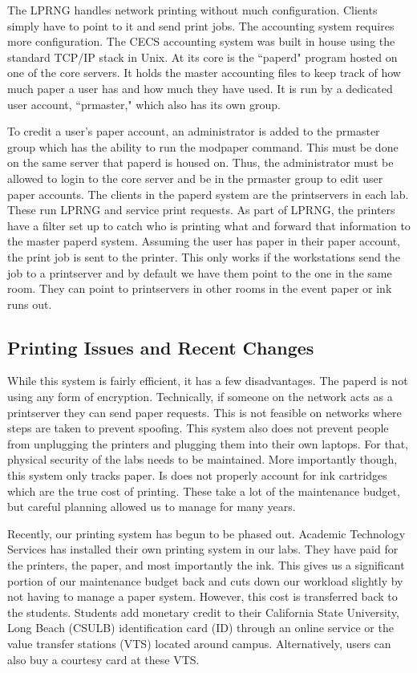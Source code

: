 The LPRNG handles network printing without much configuration.  Clients simply have to point to it and send print jobs.  The accounting system requires more configuration.  The CECS accounting system was built in house using the standard TCP/IP stack in Unix.  At its core is the ``paperd" program hosted on one of the core servers.  It holds the master accounting files to keep track of how much paper a user has and how much they have used.  It is run by a dedicated user account, ``prmaster," which also has its own group.  

To credit a user's paper account, an administrator is added to the prmaster group which has the ability to run the modpaper command.  This must be done on the same server that paperd is housed on.  Thus, the administrator must be allowed to login to the core server and be in the prmaster group to edit user paper accounts.  
\vfill\eject
The clients in the paperd system are the printservers in each lab.  These run LPRNG and service print requests.  As part of LPRNG, the printers have a filter set up to catch who is printing what and forward that information to the master paperd system.  Assuming the user has paper in their paper account, the print job is sent to the printer. This only works if the workstations send the job to a printserver and by default we have them point to the one in the same room. They can point to printservers in other rooms in the event paper or ink runs out. 

\subsection{Printing Issues and Recent Changes}
While this system is fairly efficient, it has a few disadvantages.  The paperd is not using any form of encryption.  Technically, if someone on the network acts as a printserver they can send paper requests.  This is not feasible on networks where steps are taken to prevent spoofing.  This system also does not prevent people from unplugging the printers and plugging them into their own laptops.  For that, physical security of the labs needs to be maintained.  More importantly though, this system only tracks paper.  Is does not properly account for ink cartridges which are the true cost of printing.  These take a lot of the maintenance budget, but careful planning allowed us to manage for many years.  

Recently, our printing system has begun to be phased out.  Academic Technology Services has installed their own printing system in our labs.  They have paid for the printers, the paper, and most importantly the ink.  This gives us a significant portion of our maintenance budget back and cuts down our workload slightly by not having to manage a paper system.  However, this cost is transferred back to the students. Students add monetary credit to their California State University, Long Beach (CSULB) identification card (ID) through an online service or the value transfer stations (VTS) located around campus.  Alternatively, users can also buy a courtesy card at these VTS.  


